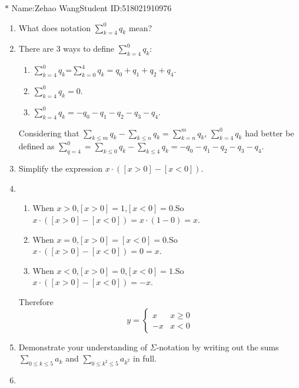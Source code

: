 \documentclass[12pt,a4paper]{article}
\makeatletter
\newtheorem*{solution}{Solution}
\theoremstyle{definition}
\renewenvironment{solution}[1][Solution] {\par\pushQED{\qed}\normalfont\topsep6\p@\@plus6\p@\relax\trivlist\item[\hskip\labelsep\bfseries#1\@addpunct{.}]\ignorespaces}{\popQED\endtrivlist\@endpefalse} \makeatother
\makeatother
\begin{document}
\noindent

\noindent{}
\begin{center}
\footnotesize{\color{blue}$*$ Name:Zehao Wang\quad Student ID:518021910976}
\end{center}

\begin{enumerate}
    \item 
    What does notation $\sum_{k=4}^{0}q_k$ mean?
    \begin{solution}
        There are 3 ways to define $\sum_{k=4}^{0}q_k$:
            \begin{enumerate}
            	\item 
            	    $\sum_{k=4}^{0}q_k$=$\sum_{k=0}^{4}q_k=q_0+q_1+q_2+q_4$.
            	\item 
            	    $\sum_{k=4}^{0}q_k=0$.
            	\item 
            	    $\sum_{k=4}^{0}q_k=-q_0-q_1-q_2-q_3-q_4$.
            \end{enumerate}
        
        Considering that $\sum_{k\le m}q_k-\sum_{k\le n}q_k=\sum_{k=n}^{m}q_k$, $\sum_{k=4}^{0}q_k$ had better be defined as $\sum_{q=4}^{0}=\sum_{k\le0}q_k-\sum_{k\le4}q_k=-q_0-q_1-q_2-q_3-q_4$.
    \end{solution}
    \item
    	Simplify the expression $x\cdot([x>0]-[x<0])$.
    	\begin{solution}
    		\begin{enumerate}
    			\item
            		When $x>0$,$[x>0]=1$,$[x<0]=0$.So $x\cdot([x>0]-[x<0])=x\cdot(1-0)=x$.
        		\item
            		When $x=0$,$[x>0]=[x<0]=0$.So $x\cdot([x>0]-[x<0])=0=x$.
        		\item
            		When $x<0$,$[x>0]=0$,$[x<0]=1$.So $x\cdot([x>0]-[x<0])=-x$.
    		\end{enumerate}
    	Therefore
    	\begin{equation*}
        y=
        \begin{cases}
            x & x\ge0\\
            -x & x<0
        \end{cases}
		\end{equation*}
    	\end{solution}
    \item 
        Demonstrate your understanding of $\Sigma$-notation by writing out the sums $\sum_{0\le k\le5}a_k$ and $\sum_{0\le k^2\le5}a_{k^2}$ in full.
        \begin{solution}
        	

\end{solution}
\end{enumerate}
\end{document}
